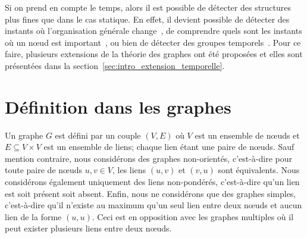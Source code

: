 Si on prend en compte le temps, alors il est possible de détecter des structures plus fines que dans le cas statique.
En effet, il devient possible de détecter des instants où l'organisation générale change~\cite{Rosvall2010}, de comprendre quels sont les instants où un n\oe{}ud est important~\cite{Magnien2015,Costa2015,Takaguchi2016}, ou bien de détecter des groupes temporels~\cite{Cazabet2010}.
Pour ce faire, plusieurs extensions de la théorie des graphes ont été proposées et elles sont présentées dans la section~\ref{sec:intro_extension_temporelle}.


\section{Définition dans les graphes}
\label{sec:def_graphe}

Un graphe $G$ est défini par un couple $(V, E)$  où $V$ est un ensemble de n\oe{}uds et $E \subseteq V \times V$ est un ensemble de liens; chaque lien étant une paire de n\oe{}uds.
Sauf mention contraire, nous considérons des graphes non-orientés, c'est-à-dire pour toute paire de n\oe{}uds $u,v \in V$, les liens $(u,v)$ et $(v,u)$ sont équivalents.
Nous considérons également uniquement des liens non-pondérés, c'est-à-dire qu'un lien est soit présent soit absent.
Enfin, nous ne considérons que des graphes simples, c'est-à-dire qu'il n'existe au maximum qu'un seul lien entre deux n\oe{}uds et aucun lien de la forme $(u,u)$.
Ceci est en opposition avec les graphes multiples où il peut exister plusieurs liens entre deux n\oe{}uds.

